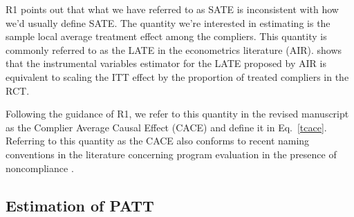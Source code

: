 \documentclass[hidelinks,12pt,letterpaper]{article}
\begin{document}
R1 points out that what we have referred to as SATE is inconsistent with how we'd usually define SATE. The quantity we're interested in estimating is the sample local average treatment effect among the compliers. This quantity is commonly referred to as the LATE in the econometrics literature \citep[e.g.,][]{Angrist1996} (AIR). \citet{freedman2006} shows that the instrumental variables estimator for the LATE proposed by AIR is equivalent to scaling the ITT effect by the proportion of treated compliers in the RCT.

Following the guidance of R1, we refer to this quantity in the revised manuscript as the Complier Average Causal Effect (CACE) and define it in Eq.~\eqref{tcace}. Referring to this quantity as the CACE also conforms to recent naming conventions in the literature concerning program evaluation in the presence of noncompliance \citep{yau2001inference,frumento2012evaluating}.

\subsection{Estimation of PATT}


\end{document}
